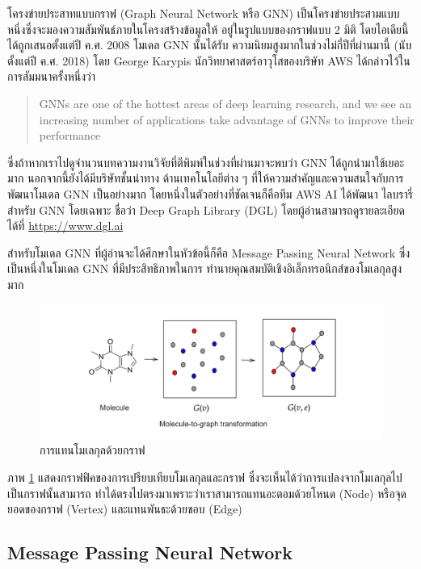 โครงข่ายประสาทแบบกราฟ (Graph Neural Network หรือ GNN) เป็นโครงข่ายประสามแบบหนึ่งซึ่งจะมองความสัมพันธ์ภายในโครงสร้างข้อมูลให้%
อยู่ในรูปแบบของกราฟแบบ 2 มิติ โดยไอเดียนี้ได้ถูกเสนอตั้งแต่ปี ค.ศ. 2008\autocite{scarselli2009,zhou2020} โมเดล GNN นั้นได้รับ%
ความนิยมสูงมากในช่วงไม่กี่ปีที่ผ่านมานี้ (นับตั้งแต่ปี ค.ศ. 2018) โดย George Karypis นักวิทยาศาสตร์อาวุโสของบริษัท AWS ได้กล่าวไว้ใน%
การสัมมนาครั้งหนึ่งว่า 

\blockquote{GNNs are one of the hottest areas of deep learning research, and we see an increasing number of 
applications take advantage of GNNs to improve their performance}

\noindent ซึ่งถ้าหากเราไปดูจำนวนบทความงานวิจัยที่ตีพิมพ์ในช่วงที่ผ่านมาจะพบว่า GNN ได้ถูกนำมาใช้เยอะมาก นอกจากนี้ยังได้มีบริษัทชั้นนำทาง%
ด้านเทคโนโลยีต่าง ๆ ที่ให้ความสำคัญและความสนใจกับการพัฒนาโมเดล GNN เป็นอย่างมาก โดยหนึ่งในตัวอย่างที่ชัดเจนก็คือทีม AWS AI ได้พัฒนา%
ไลบรารี่สำหรับ GNN โดยเฉพาะ ชื่อว่า Deep Graph Library (DGL) โดยผู้อ่านสามารถดูรายละเอียดได้ที่ \url{https://www.dgl.ai}

สำหรับโมเดล GNN ที่ผู้อ่านจะได้ศึกษาในหัวข้อนี้ก็คือ Message Passing Neural Network ซึ่งเป็นหนึ่งในโมเดล GNN ที่มีประสิทธิภาพในการ%
ทำนายคุณสมบัติเชิงอิเล็กทรอนิกส์ของโมเลกุลสูงมาก

\begin{figure}[htbp]
    \centering
    \includegraphics[width=\linewidth]{fig/mol-2-graph.png}
    \caption{การแทนโมเลกุลด้วยกราฟ}
    \label{fig:mol_2_graph}
\end{figure}

ภาพ \ref{fig:mol_2_graph} แสดงกราฟฟิคของการเปรียบเทียบโมเลกุลและกราฟ ซึ่งจะเห็นได้ว่าการแปลงจากโมเลกุลไปเป็นกราฟนั้นสามารถ%
ทำได้ตรงไปตรงมาเพราะว่าเราสามารถแทนอะตอมด้วยโหนด (Node) หรือจุดยอดของกราฟ (Vertex) และแทนพันธะด้วยขอบ (Edge)

\subsection{Message Passing Neural Network}
\label{ssec:mpnn}

